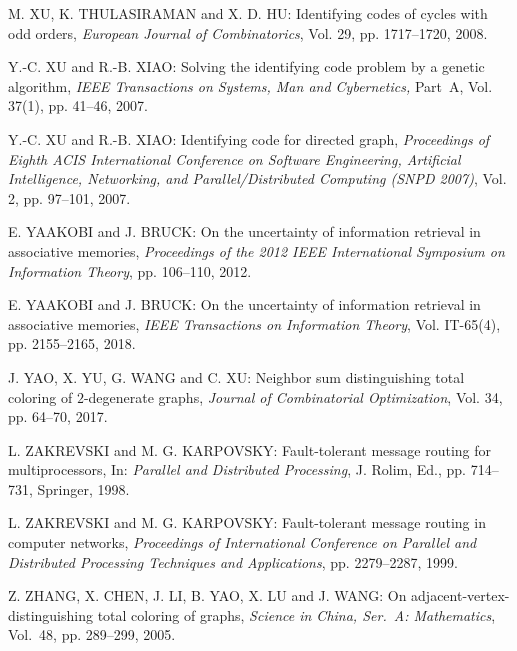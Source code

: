 \begin{thebibliography}{999}
M. XU, K. THULASIRAMAN and X. D. HU: Identifying codes of cycles with odd orders, {\it European Journal of Combinatorics}, Vol. 29, pp. 1717--1720, 2008.

Y.-C. XU and R.-B. XIAO: Solving the identifying code problem by a genetic algorithm, {\it IEEE Transactions on Systems, Man and Cybernetics,} Part~A, Vol. 37(1), pp. 41--46, 2007. 

Y.-C. XU and R.-B. XIAO: Identifying code for directed graph, {\it Proceedings of Eighth ACIS International Conference on Software Engineering, Artificial Intelligence, Networking, and Parallel/Distributed Computing (SNPD 2007)}, Vol. 2, pp. 97--101, 2007.

E. YAAKOBI and J. BRUCK: On the uncertainty of information retrieval in associative memories, {\it Proceedings of the 2012 IEEE International Symposium on Information Theory}, pp. 106--110, 2012.

E. YAAKOBI and J. BRUCK: On the uncertainty of information retrieval in associative memories, {\it IEEE Transactions on Information Theory}, Vol. IT-65(4), pp. 2155--2165, 2018.

J. YAO, X. YU, G. WANG and C. XU: Neighbor sum distinguishing total coloring of $2$-degenerate graphs, {\it Journal of Combinatorial Optimization}, Vol. 34, pp. 64--70, 2017.  

L. ZAKREVSKI and M. G. KARPOVSKY: Fault-tolerant message routing for multiprocessors, In: {\it Parallel and Distributed Processing}, J. Rolim, Ed., pp. 714--731, Springer, 1998.

L. ZAKREVSKI and M. G. KARPOVSKY: Fault-tolerant message routing in computer networks, {\it Proceedings of International Conference on Parallel and Distributed Processing Techniques and Applications}, pp. 2279--2287, 1999.

Z. ZHANG, X. CHEN, J. LI, B. YAO, X. LU and J. WANG: On adjacent-vertex-distinguishing total coloring of graphs, {\it Science in China, Ser.~A: Mathematics}, Vol.~48, pp. 289--299, 2005.
\end{thebibliography}

